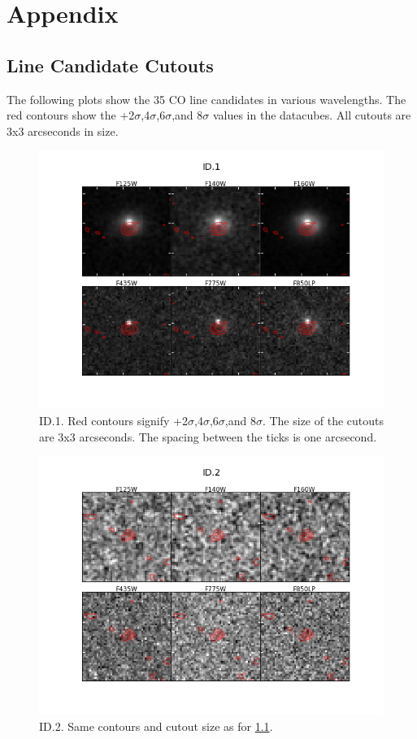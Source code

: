 \chapter{Appendix}

\section{Line Candidate Cutouts}\label{sec:A1}

The following plots show the 35 CO line candidates in various wavelengths. The red contours show the +2$\sigma$,4$\sigma$,6$\sigma$,and 8$\sigma$ values in the datacubes. All cutouts are 3x3 arcseconds in size.

\begin{figure}[tbp]
\centering \includegraphics[width=160mm]{Matched/ASPECS_Cutout_0.png}
\caption{ID.1. Red contours signify +2$\sigma$,4$\sigma$,6$\sigma$,and 8$\sigma$. The size of the cutouts are 3x3 arcseconds. The spacing between the ticks is one arcsecond.}
\label{fig:Match_One}
\end{figure}

\begin{figure}[tbp]
\centering \includegraphics[width=160mm]{Matched/ASPECS_Cutout_1.png}
\caption{ID.2. Same contours and cutout size as for \ref{fig:Match_One}.}
\label{fig:Match_Two}
\end{figure}


